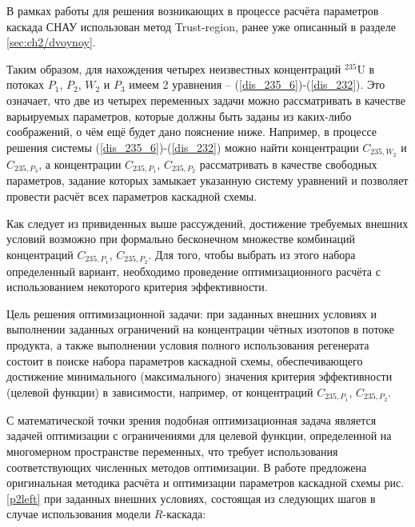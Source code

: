В рамках работы для решения возникающих в процессе расчёта параметров каскада СНАУ использован метод Trust-region, ранее уже описанный в разделе \ref{sec:ch2/dvoynoy}.

Таким образом, для нахождения четырех неизвестных концентраций $^{235}$U в потоках $P_1$, $P_2$, $W_2$ и $P_3$ имеем 2 уравнения -- (\ref{dis_235_6})-(\ref{dis_232}). Это означает, что две из четырех переменных задачи можно рассматривать в качестве варьируемых параметров, которые должны быть заданы из каких-либо соображений, о чём ещё будет дано пояснение ниже. Например, в процессе решения системы (\ref{dis_235_6})-(\ref{dis_232}) можно найти концентрации $C_{235,{W_2}}$ и $C_{235,{P_3}}$, а концентрации $C_{235,{P_1}}$, $C_{235,{P_2}}$ рассматривать в качестве свободных параметров, задание которых замыкает указанную систему уравнений и позволяет провести расчёт всех параметров каскадной схемы. 

Как следует из привиденных выше рассуждений, достижение требуемых внешних условий возможно при формально бесконечном множестве комбинаций концентраций $C_{235,{P_1}}$, $C_{235,{P_2}}$. Для того, чтобы выбрать из этого набора определенный вариант, необходимо проведение оптимизационного расчёта с использованием некоторого критерия эффективности. 

Цель решения оптимизационной задачи: при заданных внешних условиях и выполнении заданных ограничений на концентрации чётных изотопов в потоке продукта, а также выполнении условия полного использования регенерата состоит в поиске набора параметров каскадной схемы, обеспечивающего достижение минимального (максимального) значения критерия эффективности (целевой функции) в зависимости, например, от концентраций $C_{235,{P_1}}$, $C_{235,{P_2}}$.

С математической точки зрения подобная оптимизационная задача является задачей оптимизации с ограничениями для целевой функции, определенной на многомерном пространстве переменных, что требует использования соответствующих численных методов оптимизации. В работе предложена оригинальная методика расчёта и оптимизации параметров каскадной схемы рис. \ref{p2left} при заданных внешних условиях, состоящая из следующих шагов в случае использования модели $R$-каскада:

